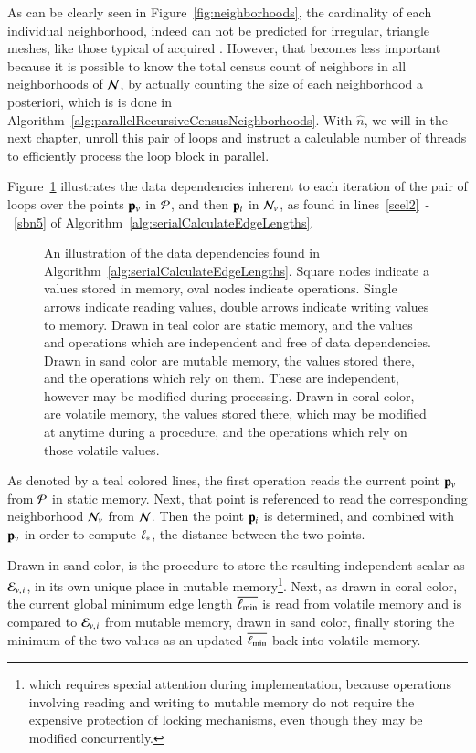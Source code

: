 As can be clearly seen in Figure~\ref{fig:neighborhoods}, the cardinality of each individual neighborhood, indeed can not be predicted for irregular, triangle meshes, like those typical of acquired \tdd{}. However, that becomes less important because it is possible to know the total census count of neighbors in all neighborhoods of $\mathcal{N}$, by actually counting the size of each neighborhood a posteriori, which is is done in Algorithm~\ref{alg:parallelRecursiveCensusNeighborhoods}. With $\hat{n}$, we will in the next chapter, unroll this pair of loops and instruct a calculable number of threads to efficiently process the loop block in parallel.

Figure~\ref{fig:sacelDataDependencies} illustrates the data dependencies inherent to each iteration of the pair of loops over the points $\mathbf{p}_v$ in $\mathcal{P}$, and then $\mathbf{p}_i$ in $\mathcal{N}_v$, as found in lines~\ref{scel2}~-~\ref{sbn5} of Algorithm~\ref{alg:serialCalculateEdgeLengths}.

\begin{figure}[ht]
	
	{\caption[Data Dependencies in Serial Algorithm~\ref{alg:serialCalculateEdgeLengths}: Calculate Edge Lengths]{An illustration of the data dependencies found in Algorithm~\ref{alg:serialCalculateEdgeLengths}. Square nodes indicate a values stored in memory, oval nodes indicate operations. Single arrows indicate reading values, double arrows indicate writing values to memory. Drawn in teal color are static memory, and the values and operations which are independent and free of data dependencies. Drawn in sand color are mutable memory, the values stored there, and the operations which rely on them. These are independent, however may be modified during processing. Drawn in coral color, are volatile memory, the values stored there, which may be modified at anytime during a procedure, and the operations which rely on those volatile values.}\label{fig:sacelDataDependencies}}
\end{figure}

As denoted by a teal colored lines, the first operation reads the current point $\mathbf{p}_v$ from $\mathcal{P}$ in static memory. Next, that point is referenced to read the corresponding neighborhood $\mathcal{N}_v$ from $\mathcal{N}$. Then the point $\mathbf{p}_i$ is determined, and combined with $\mathbf{p}_v$ in order to compute $\ell_\ast$, the distance between the two points.

Drawn in sand color, is the procedure to store the resulting independent scalar as $\mathcal{E}_{v,\kern.75pt i}$, in its own unique place in mutable memory\footnote{which requires special attention during implementation, because operations involving reading and writing to mutable memory do not require the expensive protection of locking mechanisms, even though they may be modified concurrently.}. Next, as drawn in coral color, the current global minimum edge length $\overline{\ell_\text{min}}$ is read from volatile memory and is compared to $\mathcal{E}_{v,\kern.75pt i}$ from mutable memory, drawn in sand color, finally storing the minimum of the two values as an updated $\overline{\ell_\text{min}}$ back into volatile memory.

